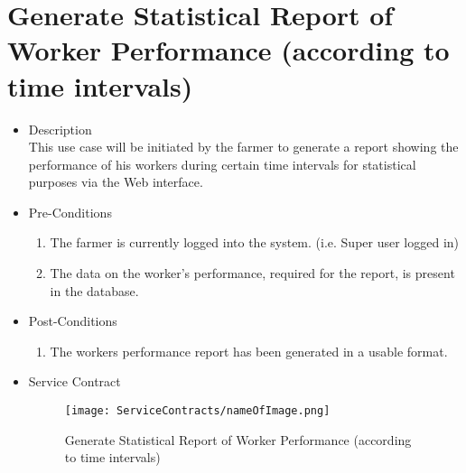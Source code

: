 \documentclass[11pt,fleqn]{book} %
\begin{document}
\section{Generate Statistical Report of Worker Performance (according to time intervals)}
\begin{itemize}
	\item Description\\
	This use case will be initiated by the farmer to generate a report showing the performance of his workers during certain time intervals for statistical purposes via the Web interface.
	\item Pre-Conditions
	\begin{enumerate}
		\item The farmer is currently logged into the system. (i.e. Super user logged in)
		\item The data on the worker’s performance, required for the report, is present in the database.		
	\end{enumerate}
	\item Post-Conditions
	\begin{enumerate}
		\item The workers performance report has been generated in a usable format.
	\end{enumerate}
	\item Service Contract
	\begin{figure}
		\texttt{[image: ServiceContracts/nameOfImage.png]}
		\caption{Generate Statistical Report of Worker Performance (according to time intervals)}
	\end{figure}
\end{itemize}
\end{document}
